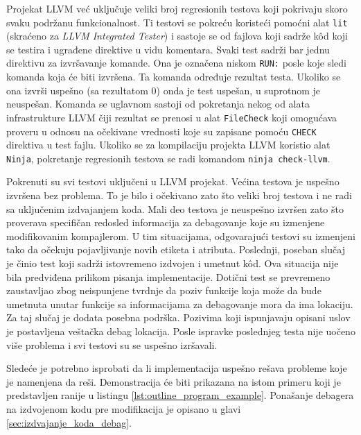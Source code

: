 \documentclass[12pt,oneside]{memoir}
\begin{document}
Projekat LLVM već uključuje veliki broj regresionih testova koji pokrivaju skoro svaku podržanu funkcionalnost.
Ti testovi se pokreću koristeći pomoćni alat \verb|lit| (skraćeno za {\em LLVM Integrated Tester}) i sastoje se od fajlova koji sadrže k\^od koji se testira i ugrađene direktive u vidu komentara.
Svaki test sadrži bar jednu direktivu za izvršavanje komande. Ona je označena niskom \verb|RUN:| posle koje sledi komanda koja će biti izvršena.
Ta komanda određuje rezultat testa. Ukoliko se ona izvrši uspešno (sa rezultatom 0) onda je test uspešan, u suprotnom je neuspešan.
Komanda se uglavnom sastoji od pokretanja nekog od alata infrastrukture LLVM čiji rezultat se prenosi u alat \verb|FileCheck| koji omogućava proveru u odnosu na očekivane vrednosti koje su zapisane pomoću \verb|CHECK| direktiva u test fajlu. 
Ukoliko se za kompilaciju projekta LLVM koristio alat \verb|Ninja|, pokretanje regresionih testova se radi komandom \verb|ninja check-llvm|.

Pokrenuti su svi testovi uključeni u LLVM projekat. %
Većina testova je uspešno izvršena bez problema. To je bilo i očekivano zato što veliki broj testova i ne radi sa uključenim izdvajanjem koda.
Mali deo testova je neuspešno izvršen zato što proverava specifičan redosled informacija za debagovanje koje su izmenjene modifikovanim kompajlerom.
U tim situacijama, odgovarajući testovi su izmenjeni tako da očekuju pojavljivanje novih etiketa i atributa.
Poslednji, poseban slučaj je činio test koji sadrži istovremeno izdvojen i umetnut k\^od.
Ova situacija nije bila predviđena prilikom pisanja implementacije.
Dotični test se prevremeno zaustavljao zbog neispunjene tvrdnje da poziv funkcije koja može da bude umetnuta unutar funkcije sa informacijama za debagovanje mora da ima lokaciju.
Za taj slučaj je dodata posebna podrška.
Pozivima koji ispunjavaju opisani uslov je postavljena veštačka debag lokacija.
Posle ispravke poslednjeg testa nije uočeno više problema i svi testovi su se uspešno izršavali.

Sledeće je potrebno isprobati da li implementacija uspešno rešava probleme koje je namenjena da reši.
Demonstracija će biti prikazana na istom primeru koji je predstavljen ranije u listingu \ref{lst:outline_program_example}.
Ponašanje debagera na izdvojenom kodu pre modifikacija je opisano u glavi \ref{sec:izdvajanje_koda_debag}.
\end{document}
